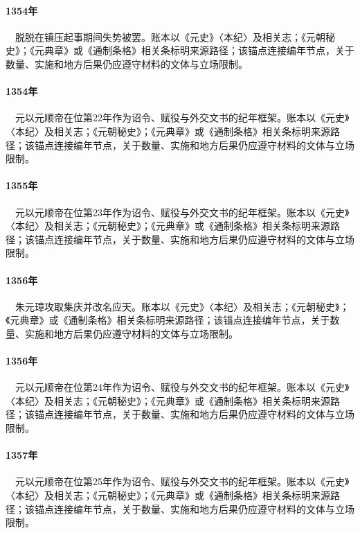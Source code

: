 \paragraph{1354年}　脱脱在镇压起事期间失势被罢。账本以《元史》〈本纪〉及相关志；《元朝秘史》；《元典章》或《通制条格》相关条标明来源路径；该锚点连接编年节点，关于数量、实施和地方后果仍应遵守材料的文体与立场限制。

\paragraph{1354年}　元以元顺帝在位第22年作为诏令、赋役与外交文书的纪年框架。账本以《元史》〈本纪〉及相关志；《元朝秘史》；《元典章》或《通制条格》相关条标明来源路径；该锚点连接编年节点，关于数量、实施和地方后果仍应遵守材料的文体与立场限制。

\paragraph{1355年}　元以元顺帝在位第23年作为诏令、赋役与外交文书的纪年框架。账本以《元史》〈本纪〉及相关志；《元朝秘史》；《元典章》或《通制条格》相关条标明来源路径；该锚点连接编年节点，关于数量、实施和地方后果仍应遵守材料的文体与立场限制。

\paragraph{1356年}　朱元璋攻取集庆并改名应天。账本以《元史》〈本纪〉及相关志；《元朝秘史》；《元典章》或《通制条格》相关条标明来源路径；该锚点连接编年节点，关于数量、实施和地方后果仍应遵守材料的文体与立场限制。

\paragraph{1356年}　元以元顺帝在位第24年作为诏令、赋役与外交文书的纪年框架。账本以《元史》〈本纪〉及相关志；《元朝秘史》；《元典章》或《通制条格》相关条标明来源路径；该锚点连接编年节点，关于数量、实施和地方后果仍应遵守材料的文体与立场限制。

\paragraph{1357年}　元以元顺帝在位第25年作为诏令、赋役与外交文书的纪年框架。账本以《元史》〈本纪〉及相关志；《元朝秘史》；《元典章》或《通制条格》相关条标明来源路径；该锚点连接编年节点，关于数量、实施和地方后果仍应遵守材料的文体与立场限制。

